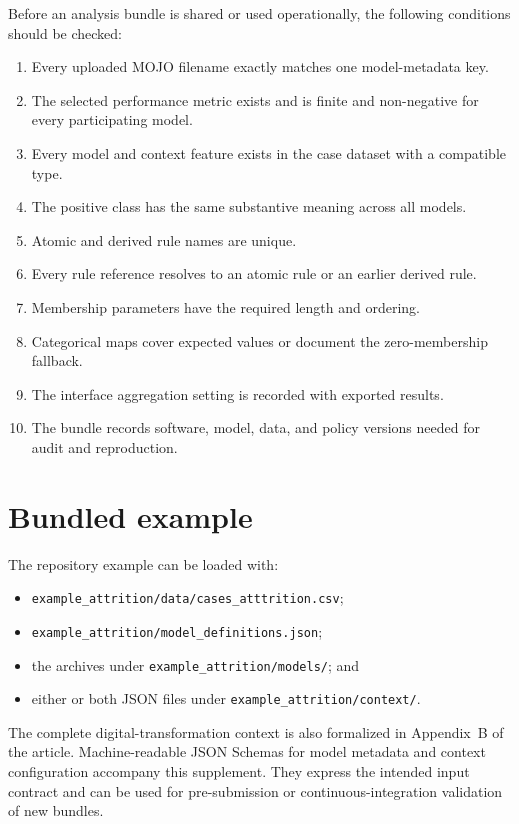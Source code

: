 \documentclass[11pt,a4paper]{article}
\begin{document}
Before an analysis bundle is shared or used operationally, the following conditions should be checked:
\begin{enumerate}
  \item Every uploaded MOJO filename exactly matches one model-metadata key.
  \item The selected performance metric exists and is finite and non-negative for every participating model.
  \item Every model and context feature exists in the case dataset with a compatible type.
  \item The positive class has the same substantive meaning across all models.
  \item Atomic and derived rule names are unique.
  \item Every rule reference resolves to an atomic rule or an earlier derived rule.
  \item Membership parameters have the required length and ordering.
  \item Categorical maps cover expected values or document the zero-membership fallback.
  \item The interface aggregation setting is recorded with exported results.
  \item The bundle records software, model, data, and policy versions needed for audit and reproduction.
\end{enumerate}

\section{Bundled example}

The repository example can be loaded with:
\begin{itemize}
  \item \texttt{example\_attrition/data/cases\_atttrition.csv};
  \item \texttt{example\_attrition/model\_definitions.json};
  \item the archives under \texttt{example\_attrition/models/}; and
  \item either or both JSON files under \texttt{example\_attrition/context/}.
\end{itemize}

The complete digital-transformation context is also formalized in Appendix~B of the article. Machine-readable JSON Schemas for model metadata and context configuration accompany this supplement. They express the intended input contract and can be used for pre-submission or continuous-integration validation of new bundles.
\end{document}
